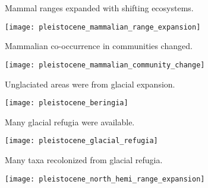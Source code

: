 \documentclass[t]{beamer}
\begin{document}
\begin{frame}[t]{Mammal ranges expanded with shifting ecosystems.}
	\vspace{-\baselineskip}
	\begin{center}
		\texttt{[image: pleistocene\_mammalian\_range\_expansion]}
	\end{center}
\end{frame}

\begin{frame}[t]{Mammalian co-occurrence in communities changed.}
	\vspace{-\baselineskip}
	\begin{center}
		\texttt{[image: pleistocene\_mammalian\_community\_change]}
	\end{center}
\end{frame}

\begin{frame}{Unglaciated areas were  from glacial expansion.}
	\vspace{-\baselineskip}
	\begin{center}
		\texttt{[image: pleistocene\_beringia]}
	\end{center}
\end{frame}

\begin{frame}{Many glacial refugia were available.}
	\vspace{-\baselineskip}
	\begin{center}
		\texttt{[image: pleistocene\_glacial\_refugia]}
	\end{center}
\end{frame}

\begin{frame}{Many taxa recolonized from glacial refugia.}
	\vspace{-\baselineskip}
	\begin{center}
		\texttt{[image: pleistocene\_north\_hemi\_range\_expansion]}
	\end{center}
\end{frame}
\end{document}
